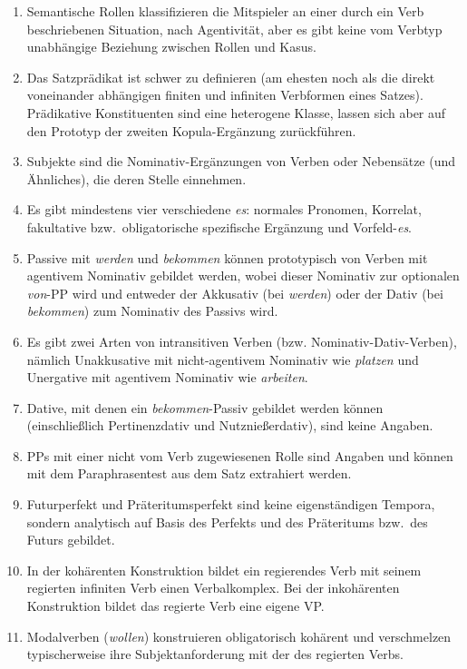 \begin{sloppypar}

\begin{enumerate}
  \item Semantische Rollen klassifizieren die Mitspieler an einer durch ein Verb beschriebenen Situation, \zB nach Agentivität, aber es gibt keine vom Verbtyp unabhängige Beziehung zwischen Rollen und Kasus.
  \item Das Satzprädikat ist schwer zu definieren (am ehesten noch als die direkt voneinander abhängigen finiten und infiniten Verbformen eines Satzes).
    Prädikative Konstituenten sind eine heterogene Klasse, lassen sich aber auf den Prototyp der zweiten Kopula-Ergänzung zurückführen.
  \item Subjekte sind die Nominativ-Ergänzungen von Verben oder Nebensätze (und Ähnliches), die deren Stelle einnehmen.
  \item Es gibt mindestens vier verschiedene \textit{es}: normales Pronomen, Korrelat, fakultative bzw.\ obligatorische spezifische Ergänzung und Vorfeld-\textit{es}.
  \item Passive mit \textit{werden} und \textit{bekommen} können prototypisch von Verben mit agentivem Nominativ gebildet werden, wobei dieser Nominativ zur optionalen \textit{von}-PP wird und entweder der Akkusativ (bei \textit{werden}) oder der Dativ (bei \textit{bekommen}) zum Nominativ des Passivs wird.
  \item Es gibt zwei Arten von intransitiven Verben (bzw. Nominativ-Dativ-Verben), nämlich Unakkusative mit nicht-agentivem Nominativ wie \textit{platzen} und Unergative mit agentivem Nominativ wie \textit{arbeiten}.
  \item Dative, mit denen ein \textit{bekommen}-Passiv gebildet werden können (einschließlich Pertinenzdativ und Nutznießerdativ), sind keine Angaben.
  \item PPs mit einer nicht vom Verb zugewiesenen Rolle sind Angaben und können mit dem Paraphrasentest aus dem Satz extrahiert werden.
  \item Futurperfekt und Präteritumsperfekt sind keine eigenständigen Tempora, sondern analytisch auf Basis des Perfekts und des Präteritums bzw.\ des Futurs gebildet.
  \item In der kohärenten Konstruktion bildet ein regierendes Verb mit seinem regierten infiniten Verb einen Verbalkomplex.
    Bei der inkohärenten Konstruktion bildet das regierte Verb eine eigene VP.
  \item Modalverben (\textit{wollen}) konstruieren obligatorisch kohärent und verschmelzen typischerweise ihre Subjektanforderung mit der des regierten Verbs.

\end{enumerate}
\end{sloppypar}

